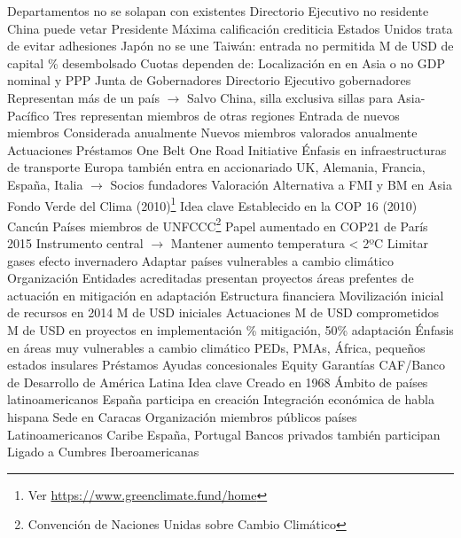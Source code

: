 \documentclass{nuevotema}
\begin{document}
\begin{esquemal}
				\4 Departamentos no se solapan con existentes
				\4 Directorio Ejecutivo no residente
				\4 China puede vetar Presidente
				\4 Máxima calificación crediticia
				\4 Estados Unidos trata de evitar adhesiones
				\4 Japón no se une
				\4 Taiwán: entrada no permitida
				 M de USD de capital
				\% desembolsado
				\4 Cuotas dependen de:
				\4[] Localización en en Asia o no
				\4[] GDP nominal y PPP
				\4 Junta de Gobernadores
				\4 Directorio Ejecutivo
				 gobernadores
				\4[] Representan más de un país
				\4[] $\to$ Salvo China, silla exclusiva
				 sillas para Asia-Pacífico
				\4[] Tres representan miembros de otras regiones
				\4 Entrada de nuevos miembros
				\4[] Considerada anualmente
				\4 Nuevos miembros valorados anualmente
			\3 Actuaciones
				\4 Préstamos One Belt One Road Initiative
				\4 Énfasis en infraestructuras de transporte
				\4 Europa también entra en accionariado
				\4[] UK, Alemania, Francia, España, Italia
				\4[] $\to$ Socios fundadores
			\3 Valoración
				\4 Alternativa a FMI y BM en Asia
				\4
		\2 Fondo Verde del Clima (2010)\footnote{Ver \url{https://www.greenclimate.fund/home}}
			\3 Idea clave
				\4 Establecido en la COP 16 (2010) Cancún
				\4 Países miembros de UNFCCC\footnote{Convención de Naciones Unidas sobre Cambio Climático}
				\4 Papel aumentado en COP21 de París 2015
				\4[] Instrumento central
				\4[] $\to$ Mantener aumento temperatura < 2ºC
				\4 Limitar gases efecto invernadero
				\4 Adaptar países vulnerables a cambio climático
			\3 Organización
				\4 Entidades acreditadas presentan proyectos
				 áreas prefentes de actuación
				 en mitigación
				 en adaptación
				\4 Estructura financiera
				\4[] Movilización inicial de recursos en 2014
				 M de USD iniciales
			\3 Actuaciones
				 M de USD comprometidos
				 M de USD en proyectos en implementación
				\% mitigación, 50\% adaptación
				\4 Énfasis en áreas muy vulnerables a cambio climático
				\4[] PEDs, PMAs, África, pequeños estados insulares
				\4 Préstamos
				\4 Ayudas concesionales
				\4 Equity
				\4 Garantías
		\2 CAF/Banco de Desarrollo de América Latina
			\3 Idea clave
				\4 Creado en 1968
				\4 Ámbito de países latinoamericanos
				\4 España participa en creación
				\4 Integración económica de habla hispana
				\4 Sede en Caracas
			\3 Organización
				 miembros públicos
				 países
				\4[] Latinoamericanos
				\4[] Caribe
				\4[] España, Portugal
				\4 Bancos privados también participan
				\4 Ligado a Cumbres Iberoamericanas

\end{esquemal}
\end{document}
